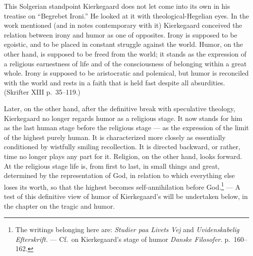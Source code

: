 \documentclass[12pt]{book}
\begin{document}
This Solgerian standpoint Kierkegaard does not let come into its own in his treatise
on ``Begrebet Ironi.'' He looked at it with theological-Hegelian eyes. In the work
mentioned (and in notes contemporary with it) Kierkegaard conceived the relation
between irony and humor as one of opposites. Irony is supposed to be egoistic, and to
be placed in constant struggle against the world. Humor, on the other hand, is
supposed to be freed from the world; it stands as the expression of a religious
earnestness of life and of the consciousness of belonging within a great whole. Irony
is supposed to be aristocratic and polemical, but humor is reconciled with the world
and rests in a faith that is held fast despite all absurdities. (Skrifter XIII
p.~35--119.)

Later, on the other hand, after the definitive break with speculative theology,
Kierkegaard no longer regards humor as a religious stage. It now stands for him as the
last human stage before the religious stage --- as the expression of the limit of the
highest purely human. It is characterized more closely as essentially conditioned by
wistfully smiling recollection. It is directed backward, or rather, time no longer
plays any part for it. Religion, on the other hand, looks forward. At the religious
stage life is, from first to last, in small things and great, determined by the
representation of God, in relation to which everything else loses its worth, so that
the highest becomes self-annihilation before God.\footnote{The writings belonging
here are: \textit{Studier paa Livets Vej} and \textit{Uvidenskabelig Efterskrift.}
--- Cf.\ on Kierkegaard's stage of humor \textit{Danske Filosofer}.
p.~160--162.} --- A test of this definitive view of humor of Kierkegaard's will be
undertaken below, in the chapter on the tragic and humor.

\end{document}
